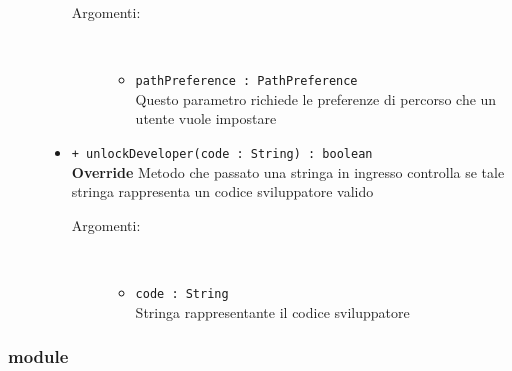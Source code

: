 \documentclass[../DefinizioneDiProdotto.tex]{subfiles}
\begin{document}
\begin{description}
\begin{itemize}
		\begin{description}
			\item[Argomenti:] \
			\begin{itemize}
				\item \texttt{pathPreference : PathPreference}\\
				Questo parametro richiede le preferenze di percorso che un utente vuole impostare\end{itemize}
		\end{description}
		\item \texttt{+ unlockDeveloper(code : String) : boolean}\\
		\textbf{Override} Metodo che passato una stringa in ingresso controlla se tale stringa rappresenta un codice sviluppatore valido
		\begin{description}
			\item[Argomenti:] \
			\begin{itemize}
				\item \texttt{code : String}\\
				Stringa rappresentante il codice sviluppatore\end{itemize}
		\end{description}
	\end{itemize}
\end{description}
\subsubsection{module}
\end{document}

